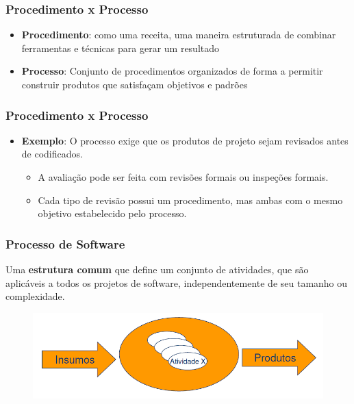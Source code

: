  \begin{frame}
  \frametitle{Procedimento x Processo}
  \begin{itemize}
   \item \textbf{Procedimento}: como uma receita, uma
maneira estruturada de combinar ferramentas e técnicas para gerar um
resultado 
\item \textbf{Processo}: Conjunto de procedimentos organizados de forma a permitir construir
produtos que satisfaçam objetivos e padrões
  \end{itemize}
 \end{frame}

  \begin{frame}
  \frametitle{Procedimento x Processo}
  \begin{itemize}
   \item \textbf{Exemplo}: O processo exige que os produtos
de projeto sejam revisados antes de
codificados.
\begin{itemize}
 \item A avaliação pode ser feita com revisões formais
ou inspeções formais.
\item Cada tipo de revisão possui um procedimento,
mas ambas com o mesmo objetivo estabelecido pelo processo.
\end{itemize}
  \end{itemize}
 \end{frame}
  
 \begin{frame}
 \frametitle{Processo de Software}
 \begin{center}
  \begin{block}{}
   Uma \textbf{estrutura comum} que define um conjunto de atividades, que são aplicáveis a
todos os projetos de software, independentemente de seu tamanho ou complexidade.
  \end{block}
 \end{center}
\begin{figure}
 \centering
 \includegraphics[height = 0.4\textheight]{figs/fig4.png}
\end{figure}
 \end{frame}
 
